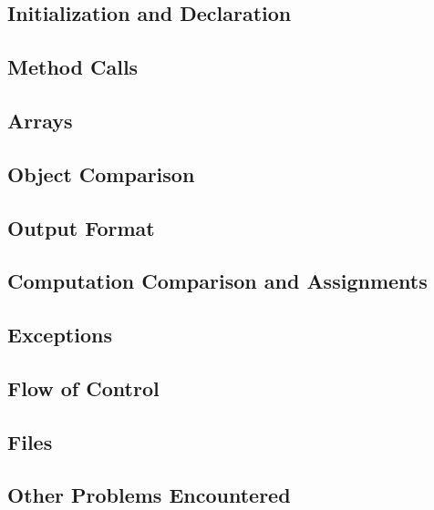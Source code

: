 \subsection{Initialization and Declaration}
\subsection{Method Calls}
\subsection{Arrays}
\subsection{Object Comparison}
\subsection{Output Format}
\subsection{Computation Comparison and Assignments}
\subsection{Exceptions}
\subsection{Flow of Control}
\subsection{Files}
\subsection{Other Problems Encountered}